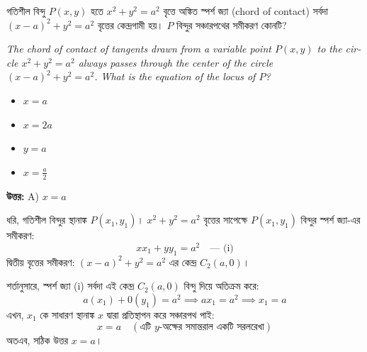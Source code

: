 \documentclass[12pt, a4paper]{article}
\begin{document}
\begin{tcolorbox}[questionbox={প্রশ্ন (Question) 34}]
    \noindent
    গতিশীল বিন্দু $P(x, y)$ হতে $x^2 + y^2 = a^2$ বৃত্তে অঙ্কিত স্পর্শ জ্যা (chord of contact) সর্বদা $(x - a)^2 + y^2 = a^2$ বৃত্তের কেন্দ্রগামী হয়। $P$ বিন্দুর সঞ্চারপথের সমীকরণ কোনটি?
    
    \vspace{0.8em}
    \begin{english}
    \noindent\textit{\color{darkgray}
    The chord of contact of tangents drawn from a variable point $P(x, y)$ to the circle $x^2 + y^2 = a^2$ always passes through the center of the circle $(x - a)^2 + y^2 = a^2$. What is the equation of the locus of $P$?
    }
    \end{english}
\end{tcolorbox}

\begin{itemize}[label={}, leftmargin=1cm, itemsep=0.5em]
    \item[\textbf{A)}] $x = a$
    \item[\textbf{B)}] $x = 2a$
    \item[\textbf{C)}] $y = a$
    \item[\textbf{D)}] $x = \frac{a}{2}$
\end{itemize}

\vspace{0.5em}
\begin{tcolorbox}[answerbox]
    \textbf{\color{success} উত্তর:} A) $x = a$
\end{tcolorbox}
\vspace{1em}

\begin{tcolorbox}[solutionbox={সমাধান (Solution)}]
    \noindent
    ধরি, গতিশীল বিন্দুর স্থানাঙ্ক $P(x_1, y_1)$। $x^2 + y^2 = a^2$ বৃত্তের সাপেক্ষে $P(x_1, y_1)$ বিন্দুর স্পর্শ জ্যা-এর সমীকরণ:
    \[ xx_1 + yy_1 = a^2 \quad \text{--- (i)} \]
    দ্বিতীয় বৃত্তের সমীকরণ: $(x - a)^2 + y^2 = a^2$ এর কেন্দ্র $C_2(a, 0)$। 
    
    \vspace{0.5em}
    শর্তানুসারে, স্পর্শ জ্যা (i) সর্বদা এই কেন্দ্র $C_2(a, 0)$ বিন্দু দিয়ে অতিক্রম করে:
    \[ a(x_1) + 0(y_1) = a^2 \implies ax_1 = a^2 \implies x_1 = a \]
    এখন, $x_1$ কে সাধারণ স্থানাঙ্ক $x$ দ্বারা প্রতিস্থাপন করে সঞ্চারপথ পাই:
    \[ x = a \quad (\text{এটি } y\text{-অক্ষের সমান্তরাল একটি সরলরেখা}) \]
    অতএব, সঠিক উত্তর $x = a$।
\end{tcolorbox}
\end{document}
